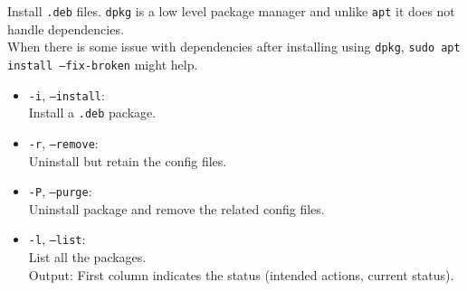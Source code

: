 Install \texttt{.deb} files. \texttt{dpkg} is a low level package manager and unlike \texttt{apt} it does not handle dependencies.\\
When there is some issue with dependencies after installing using \texttt{dpkg}, \texttt{sudo apt install --fix-broken} might help.\\


\begin{itemize}
\item \texttt{-i}, \texttt{--install}:\\Install a \texttt{.deb} package.\\
\item \texttt{-r}, \texttt{--remove}:\\ Uninstall but retain the config files.
\item \texttt{-P}, \texttt{--purge}:\\ Uninstall package and remove the related config files.
\item \texttt{-l}, \texttt{--list}:\\ List all the packages.\\
        Output: First column indicates the status (intended actions, current status).
\end{itemize}




\vfill\null
\columnbreak